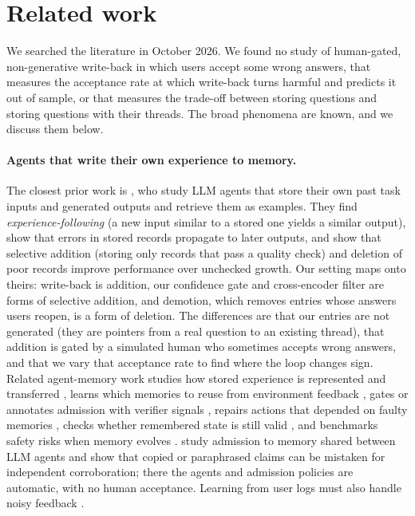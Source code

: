\documentclass[11pt]{article}
\begin{document}
\section{Related work}
We searched the literature in October 2026. We found no study of human-gated, non-generative write-back in which users accept some wrong answers, that measures the acceptance rate at which write-back turns harmful and predicts it out of sample, or that measures the trade-off between storing questions and storing questions with their threads. The broad phenomena are known, and we discuss them below.

\paragraph{Agents that write their own experience to memory.} The closest prior work is \citet{xiong2025memory}, who study LLM agents that store their own past task inputs and generated outputs and retrieve them as examples. They find \emph{experience-following} (a new input similar to a stored one yields a similar output), show that errors in stored records propagate to later outputs, and show that selective addition (storing only records that pass a quality check) and deletion of poor records improve performance over unchecked growth. Our setting maps onto theirs: write-back is addition, our confidence gate and cross-encoder filter are forms of selective addition, and demotion, which removes entries whose answers users reopen, is a form of deletion. The differences are that our entries are not generated (they are pointers from a real question to an existing thread), that addition is gated by a simulated human who sometimes accepts wrong answers, and that we vary that acceptance rate to find where the loop changes sign. Related agent-memory work studies how stored experience is represented and transferred \citep{hu2026continual}, learns which memories to reuse from environment feedback \citep{zhang2026memrl}, gates or annotates admission with verifier signals \citep{wang2026memguard}, repairs actions that depended on faulty memories \citep{yu2026rollback}, checks whether remembered state is still valid \citep{trace2026}, and benchmarks safety risks when memory evolves \citep{shao2025misevolve,xie2026memevobench}. \citet{li2026epistemic} study admission to memory shared between LLM agents and show that copied or paraphrased claims can be mistaken for independent corroboration; there the agents and admission policies are automatic, with no human acceptance. Learning from user logs must also handle noisy feedback \citep{userlogs2026}.
\end{document}
